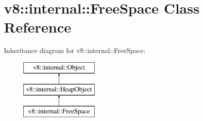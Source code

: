 \hypertarget{classv8_1_1internal_1_1_free_space}{}\section{v8\+:\+:internal\+:\+:Free\+Space Class Reference}
\label{classv8_1_1internal_1_1_free_space}
Inheritance diagram for v8\+:\+:internal\+:\+:Free\+Space\+:\begin{figure}[H]
\begin{center}
\leavevmode
\includegraphics[height=3.000000cm]{classv8_1_1internal_1_1_free_space}
\end{center}
\end{figure}
